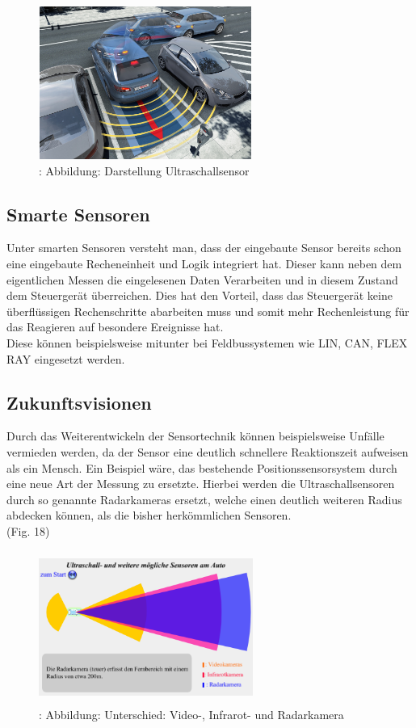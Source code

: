					\begin{figure}
						\includegraphics[width=7cm, height=5cm] {ultraschall.png}
						\caption {\cite{TS_ultraschall_pic}: Abbildung: Darstellung Ultraschallsensor}
					\end{figure}			
				
		\subsection{Smarte Sensoren} 
			Unter smarten Sensoren versteht man, dass der eingebaute Sensor bereits schon eine eingebaute Recheneinheit und Logik integriert hat. Dieser kann neben dem eigentlichen Messen die eingelesenen Daten Verarbeiten und in diesem Zustand dem Steuergerät überreichen. Dies hat den Vorteil, dass das Steuergerät keine überflüssigen Rechenschritte abarbeiten muss und somit mehr Rechenleistung für das Reagieren auf besondere Ereignisse hat.\\
			Diese können beispielsweise mitunter bei Feldbussystemen wie LIN, CAN, FLEX RAY eingesetzt werden.		
		
		
		
		\subsection{Zukunftsvisionen} 
 			Durch das Weiterentwickeln der Sensortechnik können beispielsweise Unfälle vermieden werden, da der Sensor eine deutlich schnellere Reaktionszeit aufweisen als ein Mensch. Ein Beispiel wäre, das bestehende Positionssensorsystem durch eine neue Art der Messung zu ersetzte. Hierbei werden die Ultraschallsensoren durch so genannte Radarkameras ersetzt, welche einen deutlich weiteren Radius abdecken können, als die bisher herkömmlichen Sensoren.\\(Fig. 18)
 			
 			\begin{figure}
 				\includegraphics[width=7cm, height=5cm] {radarsensor.png}
 				\caption {\cite{TS_kamera_pic}: Abbildung: Unterschied: Video-, Infrarot- und Radarkamera}
 			\end{figure}

